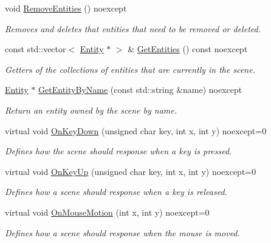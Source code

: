 \begin{DoxyCompactItemize}
\mbox{\label{class_blade_1_1_scene_a41c8f3a8a59307c42a17163614ba8dd8}} 
void \hyperlink{class_blade_1_1_scene_a41c8f3a8a59307c42a17163614ba8dd8}{Remove\+Entities} () noexcept
\begin{DoxyCompactList}\small\item\em Removes and deletes that entities that need to be removed or deleted. \end{DoxyCompactList}\item 
const std\+::vector$<$ \hyperlink{class_blade_1_1_entity}{Entity} $\ast$ $>$ \& \hyperlink{class_blade_1_1_scene_abd8993ff5deae13c05bfcdffbe9af6ff}{Get\+Entities} () const noexcept
\begin{DoxyCompactList}\small\item\em Getters of the collections of entities that are currently in the scene. \end{DoxyCompactList}\item 
\hyperlink{class_blade_1_1_entity}{Entity} $\ast$ \hyperlink{class_blade_1_1_scene_a4aa00824c68cf68734f85ac465796385}{Get\+Entity\+By\+Name} (const std\+::string \&name) noexcept
\begin{DoxyCompactList}\small\item\em Return an entity owned by the scene by name. \end{DoxyCompactList}\item 
virtual void \hyperlink{class_blade_1_1_scene_abb80a0590b4d723b5f13ec8c488e513a}{On\+Key\+Down} (unsigned char key, int x, int y) noexcept=0
\begin{DoxyCompactList}\small\item\em Defines how the scene should response when a key is pressed. \end{DoxyCompactList}\item 
virtual void \hyperlink{class_blade_1_1_scene_abe25ad91527c82b56409be7097afbf49}{On\+Key\+Up} (unsigned char key, int x, int y) noexcept=0
\begin{DoxyCompactList}\small\item\em Defines how a scene should response when a key is released. \end{DoxyCompactList}\item 
virtual void \hyperlink{class_blade_1_1_scene_aa0296f990fc1cacbfc97f657d6cb958f}{On\+Mouse\+Motion} (int x, int y) noexcept=0
\begin{DoxyCompactList}\small\item\em Defines how a scene should response when the mouse is moved. \end{DoxyCompactList}\item 

\end{DoxyCompactItemize}
